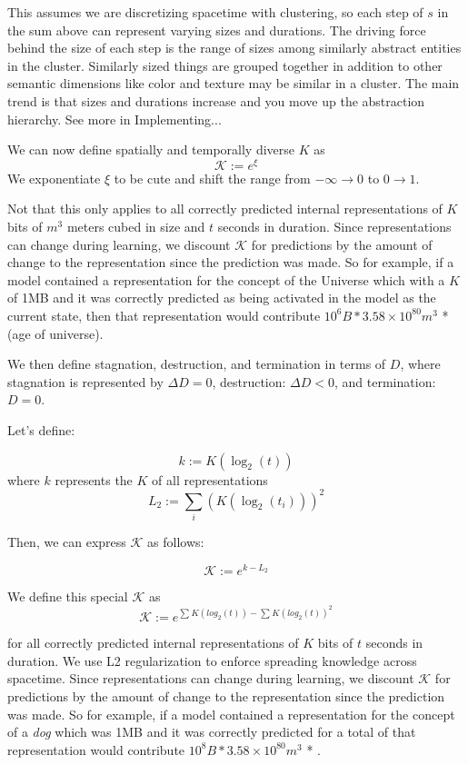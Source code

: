 \documentclass{article}
\begin{document}
This assumes we are discretizing spacetime with clustering, so each step of $s$ in the sum above can represent varying sizes and durations. The driving force behind the size of each step is the range of sizes among similarly abstract entities in the cluster. Similarly sized things are grouped together in addition to other semantic dimensions like color and texture may be similar in a cluster. The main trend is that sizes and durations increase and you move up the abstraction hierarchy. See more in Implementing...

We can now define spatially and temporally diverse $K$ as
\[
\mathcal{K}:= e^{\xi}
\]
We exponentiate $\xi$ to be cute and shift the range from $-\infty\to0$ to $0\to1$.

Not that this only applies to all correctly predicted internal representations of $K$ bits of  $m^3$ meters cubed in size and $t$ seconds in duration. Since representations can change during learning, we discount $\mathcal{K}$ for predictions by the amount of change to the representation since the prediction was made. So for example, if a model contained a representation for the concept of the Universe which with a $K$ of 1MB and it was correctly predicted as being activated in the model as the current state, then  that representation would contribute $10^{6}B * 3.58×10^{80}m^3$ * (age of universe).

We then define stagnation, destruction, and termination in terms of $D$, where stagnation is represented by $\Delta D = 0$, destruction: $\Delta D < 0$, and termination: $D = 0$.

Let's define:

\[
k := K(\log_{2}(t))
\]
where $k$ represents the $K$ of all representations
\[
L_{2} := \sum_{i} (K(\log_{2}(t_i)))^2
\]

Then, we can express \(\mathcal{K}\) as follows:

\[
\mathcal{K} := e^{k - L_{2}}
\]

We define this special $\mathcal{K}$ as
\[
\mathcal{K}:= e^{{\sum_{}K(log_{2}(t)) - \sum_{}K(log_{2}(t))^{2}}}
\]

for all correctly predicted internal representations of $K$ bits of  $t$ seconds in duration. We use L2 regularization to enforce spreading knowledge across spacetime. Since representations can change during learning, we discount $\mathcal{K}$ for predictions by the amount of change to the representation since the prediction was made. So for example, if a model contained a representation for the concept of a \emph{dog} which was 1MB and it was correctly predicted for a total of  that representation would contribute $10^{8}B * 3.58×10^{80}m^3$ * .
\end{document}
